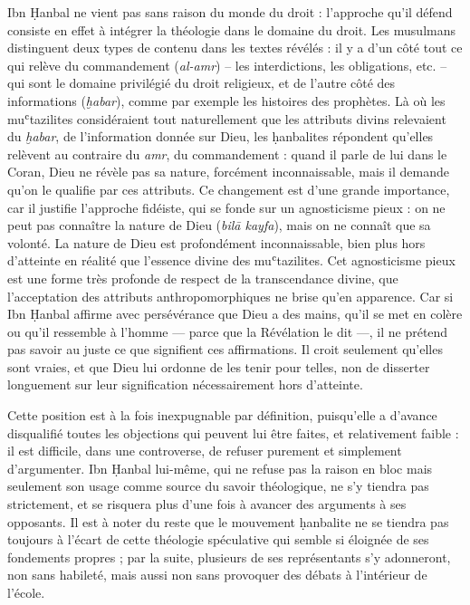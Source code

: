 Ibn Ḥanbal ne vient pas sans raison du monde du droit : l'approche qu'il
défend consiste en effet à intégrer la théologie dans le domaine du
droit. Les musulmans distinguent deux types de contenu dans les textes
révélés : il y a d'un côté tout ce qui relève du commandement
(\emph{al-amr}) -- les interdictions, les obligations, etc. -- qui sont
le domaine privilégié du droit religieux, et de l'autre côté des
informations (\emph{ḫabar}), comme par exemple les histoires des
prophètes. Là où les muʿtazilites considéraient tout naturellement que
les attributs divins relevaient du \emph{ḫabar}, de l'information donnée
sur Dieu, les ḥanbalites répondent qu'elles relèvent au contraire du
\emph{amr}, du commandement : quand il parle de lui dans le Coran, Dieu
ne révèle pas sa nature, forcément inconnaissable, mais il demande qu'on
le qualifie par ces attributs. Ce changement est d'une grande
importance, car il justifie l'approche fidéiste, qui se fonde sur un
agnosticisme pieux : on ne peut pas connaître la nature de Dieu
(\emph{bilā kayfa}), mais on ne connaît que sa volonté. La nature de
Dieu est profondément inconnaissable, bien plus hors d'atteinte en
réalité que l'essence divine des muʿtazilites. Cet agnosticisme pieux
est une forme très profonde de respect de la transcendance divine, que
l'acceptation des attributs anthropomorphiques ne brise qu'en apparence.
Car si Ibn Ḥanbal affirme avec
persévérance que Dieu a des mains, qu'il se met en colère ou qu'il
ressemble à l'homme --- parce que la Révélation le dit ---, il ne
prétend pas savoir au juste ce que signifient ces affirmations. Il croit
seulement qu'elles sont vraies, et que Dieu lui ordonne de les tenir
pour telles, non de disserter longuement sur leur signification
nécessairement hors d'atteinte.

Cette position est à la fois inexpugnable par définition, puisqu'elle a
d'avance disqualifié toutes les objections qui peuvent lui être faites,
et relativement faible : il est difficile, dans une controverse, de
refuser purement et simplement d'argumenter. Ibn Ḥanbal lui-même, qui ne
refuse pas la raison en bloc mais seulement son usage comme source du
savoir théologique, ne s'y tiendra pas strictement, et se risquera plus
d'une fois à avancer des arguments à ses opposants. Il est à noter du
reste que le mouvement ḥanbalite ne se tiendra pas toujours à l'écart de
cette théologie spéculative qui semble si éloignée de ses fondements
propres ; par la suite, plusieurs de ses représentants s'y adonneront,
non sans habileté, mais aussi non sans provoquer des débats à
l'intérieur de l'école.

